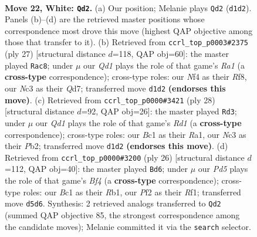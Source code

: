 \documentclass[11pt]{article}
\begin{document}
\clearpage

\begin{figure}[p]\centering
\begin{subfigure}{0.46\textwidth}\centering
\resizebox{\linewidth}{!}{%
\newchessgame
\chessboard[
  setfen={r2q1r2/ppp1b1k1/n4pp1/3P3p/P1p2Nb1/2N5/RPP1RPPP/2BQ2K1 w - - 1 22},
  showmover=false,
  pgfstyle=straightmove, color=movearrow, markmove={d1-d2}
]}
\caption{}
\end{subfigure}\hfill
\begin{subfigure}{0.46\textwidth}\centering
\resizebox{\linewidth}{!}{%
\newchessgame
\chessboard[
  setfen={r4rk1/pp1qbppp/2n1pn2/1B1p4/N2P1B2/1Q2PP2/PP3P1P/2R2RK1 b - - 8 14},
  showmover=false,
  pgfstyle=straightmove, color=movearrow, markmove={a8-c8}
]}
\caption{}
\end{subfigure}
\\[4pt]
\begin{subfigure}{0.46\textwidth}\centering
\resizebox{\linewidth}{!}{%
\newchessgame
\chessboard[
  setfen={2rq1rk1/pp3pp1/3pbb1p/n3p3/4P3/1BN2N2/PPP1QPPP/R2R2K1 w - - 2 15},
  showmover=false,
  pgfstyle=straightmove, color=movearrow, markmove={d1-d3}
]}
\caption{}
\end{subfigure}\hfill
\begin{subfigure}{0.46\textwidth}\centering
\resizebox{\linewidth}{!}{%
\newchessgame
\chessboard[
  setfen={r2q1rk1/p2n1ppp/2p1pb2/2Pp4/1P1P1Bb1/2N2N2/P4PPP/1R1Q1RK1 w - - 3 14},
  showmover=false,
  pgfstyle=straightmove, color=movearrow, markmove={f4-d6}
]}
\caption{}
\end{subfigure}
\caption{\textbf{Move 22, White: \texttt{Qd2}.} (a) Our position; Melanie plays \texttt{Qd2} (\texttt{d1d2}). Panels (b)--(d) are the retrieved master positions whose correspondence most drove this move (highest QAP objective among those that transfer to it). (b) Retrieved from \texttt{ccrl\_top\_p0003\#2375} (ply 27) [structural distance $d$=118, QAP obj=60]: the master played \texttt{Rac8}; under $\mu$ our \emph{Qd1} plays the role of that game's \emph{Ra1} (a \textbf{cross-type} correspondence); cross-type roles: our \emph{N}f4 as their \emph{R}f8, our \emph{N}c3 as their \emph{Q}d7; transferred move \texttt{d1d2} \textbf{(endorses this move)}. (c) Retrieved from \texttt{ccrl\_top\_p0000\#3421} (ply 28) [structural distance $d$=92, QAP obj=26]: the master played \texttt{Rd3}; under $\mu$ our \emph{Qd1} plays the role of that game's \emph{Rd1} (a \textbf{cross-type} correspondence); cross-type roles: our \emph{B}c1 as their \emph{R}a1, our \emph{N}c3 as their \emph{P}b2; transferred move \texttt{d1d2} \textbf{(endorses this move)}. (d) Retrieved from \texttt{ccrl\_top\_p0000\#3200} (ply 26) [structural distance $d$=112, QAP obj=40]: the master played \texttt{Bd6}; under $\mu$ our \emph{Pd5} plays the role of that game's \emph{Bf4} (a \textbf{cross-type} correspondence); cross-type roles: our \emph{B}c1 as their \emph{R}b1, our \emph{P}f2 as their \emph{R}f1; transferred move \texttt{d5d6}. Synthesis: 2 retrieved analogs transferred to \texttt{Qd2} (summed QAP objective 85, the strongest correspondence among the candidate moves); Melanie committed it via the \texttt{search} selector.}
\label{fig:thought-m42}
\end{figure}
\end{document}
